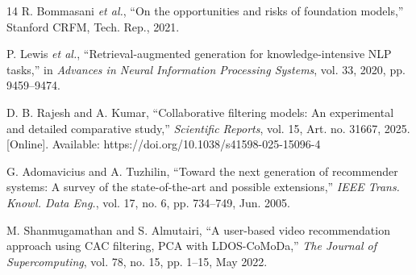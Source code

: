 \documentclass[10pt,journal,compsoc]{IEEEtran}
\begin{document}
\begin{thebibliography}{14}
R. Bommasani \emph{et al.}, ``On the opportunities and risks of foundation models,'' Stanford CRFM, Tech. Rep., 2021.

P. Lewis \emph{et al.}, ``Retrieval-augmented generation for knowledge-intensive NLP tasks,'' in \emph{Advances in Neural Information Processing Systems}, vol. 33, 2020, pp. 9459--9474.

D. B. Rajesh and A. Kumar, ``Collaborative filtering models: An experimental and detailed comparative study,'' \emph{Scientific Reports}, vol. 15, Art. no. 31667, 2025. [Online]. Available: https://doi.org/10.1038/s41598-025-15096-4

G. Adomavicius and A. Tuzhilin, ``Toward the next generation of recommender systems: A survey of the state-of-the-art and possible extensions,'' \emph{IEEE Trans. Knowl. Data Eng.}, vol. 17, no. 6, pp. 734--749, Jun. 2005.

M. Shanmugamathan and S. Almutairi, ``A user-based video recommendation approach using CAC filtering, PCA with LDOS-CoMoDa,'' \emph{The Journal of Supercomputing}, vol. 78, no. 15, pp. 1--15, May 2022.

\end{thebibliography}

\end{document}
